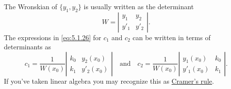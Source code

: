\documentclass{ximera}
\begin{document}
The Wronskian of  $\{y_1,y_2\}$ is usually written as the determinant
$$
W=\left| \begin{array}{cc}
y_1 & y_2 \\
y'_1 & y'_2
\end{array} \right|.
$$
 The expressions in \eqref{eq:5.1.26} for $c_1$ and $c_2$ can
be written in terms of determinants as
$$
c_1=\frac{1}{W(x_0)}
\left| \begin{array}{cc}
k_0 & y_2(x_0) \\
k_1 & y'_2(x_0)
\end{array} \right|
\quad\mbox{and}\quad
c_2=\frac{1}{W(x_0)}
\left| \begin{array}{cc}
y_1(x_0) & k_0 \\
y'_1(x_0) &k_1
\end{array} \right|.
$$
If you've taken linear algebra you may recognize this as
\href{http://www-history.mcs.st-and.ac.uk/Mathematicians/Cramer.html}{Cramer's rule}.
\end{document}
